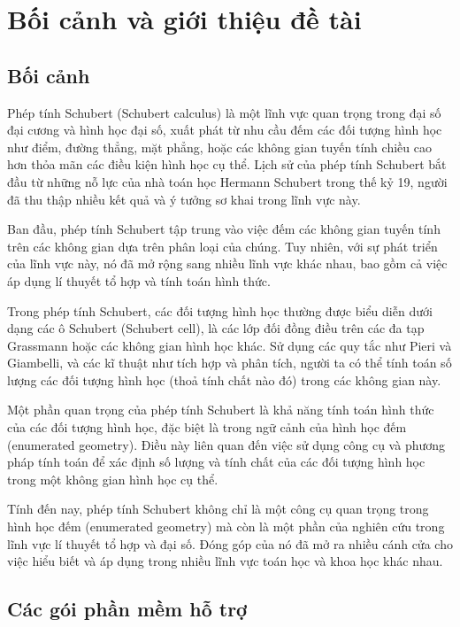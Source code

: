 \documentclass[11pt,a4paper]{book}
\begin{document}
\chapter{Bối cảnh và giới thiệu đề tài}

\section{Bối cảnh}
Phép tính Schubert (Schubert calculus) là một lĩnh vực quan trọng trong đại số đại cương và hình học đại số, xuất phát từ nhu cầu đếm các đối tượng hình học như điểm, đường thẳng, mặt phẳng, hoặc các không gian tuyến tính chiều cao hơn thỏa mãn các điều kiện hình học cụ thể. Lịch sử của phép tính Schubert bắt đầu từ những nỗ lực của nhà toán học Hermann Schubert trong thế kỷ 19, người đã thu thập nhiều kết quả và ý tưởng sơ khai trong lĩnh vực này.

Ban đầu, phép tính Schubert tập trung vào việc đếm các không gian tuyến tính trên các không gian dựa trên phân loại của chúng. Tuy nhiên, với sự phát triển của lĩnh vực này, nó đã mở rộng sang nhiều lĩnh vực khác nhau, bao gồm cả việc áp dụng lí thuyết tổ hợp và tính toán hình thức.

Trong phép tính Schubert, các đối tượng hình học thường được biểu diễn dưới dạng các ô Schubert (Schubert cell), là các lớp đối đồng điều trên các đa tạp Grassmann hoặc các không gian hình học khác. Sử dụng các quy tắc như Pieri và Giambelli, và các kĩ thuật như tích hợp và phân tích, người ta có thể tính toán số lượng các đối tượng hình học (thoả tính chất nào đó) trong các không gian này.

Một phần quan trọng của phép tính Schubert là khả năng tính toán hình thức của các đối tượng hình học, đặc biệt là trong ngữ cảnh của hình học đếm (enumerated geometry). Điều này liên quan đến việc sử dụng công cụ và phương pháp tính toán để xác định số lượng và tính chất của các đối tượng hình học trong một không gian hình học cụ thể.

Tính đến nay, phép tính Schubert không chỉ là một công cụ quan trọng trong hình học đếm (enumerated geometry) mà còn là một phần của nghiên cứu trong lĩnh vực lí thuyết tổ hợp và đại số. Đóng góp của nó đã mở ra nhiều cánh cửa cho việc hiểu biết và áp dụng trong nhiều lĩnh vực toán học và khoa học khác nhau.

\section{Các gói phần mềm hỗ trợ}
\end{document}
